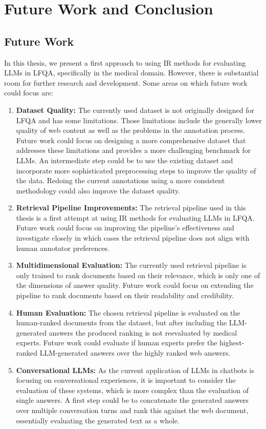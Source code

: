 \chapter{Future Work and Conclusion}\label{conclusion}

\section{Future Work}
In this thesis, we present a first approach to using IR methods for evaluating LLMs in LFQA, specifically in the medical domain.
However, there is substantial room for further research and development.
Some areas on which future work could focus are:

\begin{enumerate}
    \item \textbf{Dataset Quality:} The currently used dataset is not originally designed for LFQA and has some limitations. Those limitations include the generally lower quality of web content as well as the problems in the annotation process. Future work could focus on designing a more comprehensive dataset that addresses these limitations and provides a more challenging benchmark for LLMs. An intermediate step could be to use the existing dataset and incorporate more sophisticated preprocessing steps to improve the quality of the data. Redoing the current annotations using a more consistent methodology could also improve the dataset quality.
    \item \textbf{Retrieval Pipeline Improvements:} The retrieval pipeline used in this thesis is a first attempt at using IR methods for evaluating LLMs in LFQA. Future work could focus on improving the pipeline's effectiveness and investigate closely in which cases the retrieval pipeline does not align with human annotator preferences. 
    \item \textbf{Multidimensional Evaluation:} The currently used retrieval pipeline is only trained to rank documents based on their relevance, which is only one of the dimensions of answer quality. Future work could focus on extending the pipeline to rank documents based on their readability and credibility.
    \item \textbf{Human Evaluation:} The chosen retrieval pipeline is evaluated on the human-ranked documents from the dataset, but after including the LLM-generated answers the produced ranking is not reevaluated by medical experts. Future work could evaluate if human experts prefer the highest-ranked LLM-generated answers over the highly ranked web answers.
    \item \textbf{Conversational LLMs:} As the current application of LLMs in chatbots is focusing on conversational experiences, it is important to consider the evaluation of these systems, which is more complex than the evaluation of single answers. A first step could be to concatenate the generated answers over multiple conversation turns and rank this against the web document, essentially evaluating the generated text as a whole.
\end{enumerate}

